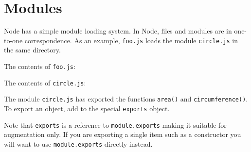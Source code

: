 \section{Modules}

\begin{Shaded}
\begin{Highlighting}[]
\NormalTok{: } 
\end{Highlighting}
\end{Shaded}

Node has a simple module loading system. In Node, files and modules are
in one-to-one correspondence. As an example, \texttt{foo.js} loads the
module \texttt{circle.js} in the same directory.

The contents of \texttt{foo.js}:

\begin{Shaded}
\begin{Highlighting}[]
 \NormalTok{);}
\NormalTok{( }
           \NormalTok{+ }\NormalTok{(}\NormalTok{));}
\end{Highlighting}
\end{Shaded}

The contents of \texttt{circle.js}:

\begin{Shaded}
\begin{Highlighting}[]
  \NormalTok{= }\NormalTok{;}

 \NormalTok{= } 
    
\NormalTok{\};}

 \NormalTok{= } 
    \NormalTok{* } 
\NormalTok{\};}
\end{Highlighting}
\end{Shaded}

The module \texttt{circle.js} has exported the functions \texttt{area()}
and \texttt{circumference()}. To export an object, add to the special
\texttt{exports} object.

Note that \texttt{exports} is a reference to \texttt{module.exports}
making it suitable for augmentation only. If you are exporting a single
item such as a constructor you will want to use \texttt{module.exports}
directly instead.

